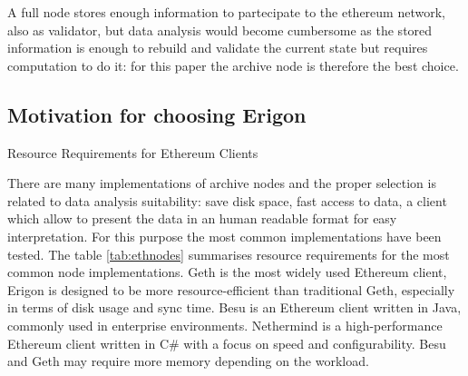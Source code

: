 \documentclass[11pt,a4paper,titlepage]{scrartcl}
\begin{document}
A full node stores enough information to partecipate to the ethereum network, also as validator, but data analysis would become cumbersome as the stored information is enough to rebuild and validate the current state but requires computation to do it: for this paper the archive node is therefore the best choice. 


\subsection {Motivation for choosing Erigon}


\begin{table}[H] %
\centering
\caption{Resource Requirements for Ethereum Clients}
\captionsetup{font=footnotesize, justification=centering}
\caption*{\footnotesize This table lists the resource requirements for different Ethereum clients, including disk and RAM usage, and CPU demands for full and archive nodes.}
\label{tab:ethnodes}
\end{table}

There are many implementations of archive nodes and the proper selection is related to  data analysis suitability: save disk space, fast access to data, a client which allow to present the data in an human readable format for easy interpretation. For this purpose  the most common implementations have been tested. The table  \ref{tab:ethnodes} summarises resource requirements for the most common node implementations. 
Geth is the most widely used Ethereum client, Erigon is designed to be more resource-efficient than traditional Geth, especially in terms of disk usage and sync time.
Besu is an Ethereum client written in Java, commonly used in enterprise environments.
Nethermind is a high-performance Ethereum client written in C\# with a focus on speed and configurability.
Besu and Geth may require more memory depending on the workload.
\end{document}
